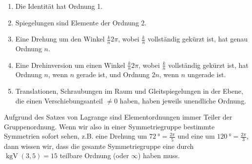 \begin{example}
\begin{enumerate}
\item Die Identität hat Ordnung 1.
\item Spiegelungen sind Elemente der Ordnung 2.
\item Eine Drehung um den Winkel $\frac{k}{n}2\pi$, wobei $\frac{k}{n}$ vollständig gekürzt ist, hat genau Ordnung $n$.
\item Eine Drehinversion um einen Winkel $\frac{k}{n}2\pi$, wobei $\frac{k}{n}$ vollständig gekürzt ist, hat Ordnung $n$, wenn $n$ gerade ist, und Ordnung $2n$, wenn $n$ ungerade ist.
\item Translationen, Schraubungen im Raum und Gleitspiegelungen in der Ebene, die einen Verschiebungsanteil $\neq 0$ haben, haben jeweils unendliche Ordnung.
\end{enumerate}
\end{example}

\begin{remark}
Aufgrund des Satzes von Lagrange sind Elementordnungen immer Teiler der Gruppenordnung. Wenn wir also in einer Symmetriegruppe bestimmte Symmetrien sofort sehen, z.B. eine Drehung um $\SI{72}{\degree}=\frac{2\pi}{5}$ und eine um $\SI{120}{\degree}=\frac{2\pi}{3}$, dann wissen wir, dass die gesamte Symmetriegruppe eine durch $\operatorname{kgV}(3,5)=15$ teilbare Ordnung (oder $\infty$) haben muss.
\end{remark}

